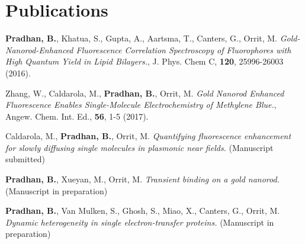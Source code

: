 \chapter*{Publications}
\label{ch:Publications}

\begin{enumerate}{%

	\item \textbf{Pradhan, B.}, Khatua, S., Gupta, A., Aartsma, T., Canters, G., Orrit, M. \textit{Gold-Nanorod-Enhanced Fluorescence Correlation Spectroscopy of Fluorophores with High Quantum Yield in Lipid Bilayers.}, J. Phys. Chem C, \textbf{120}, 25996-26003 (2016).
	
	\item Zhang, W., Caldarola, M., \textbf{Pradhan, B.}, Orrit, M. \textit{Gold Nanorod Enhanced Fluorescence Enables Single-Molecule Electrochemistry of Methylene Blue.}, Angew. Chem. Int. Ed., \textbf{56}, 1-5 (2017).

	\item Caldarola, M., \textbf{Pradhan, B.}, Orrit, M. \textit{Quantifying fluorescence enhancement for slowly diffusing single molecules in plasmonic near fields.} (Manuscript submitted)

	\item \textbf{Pradhan, B.}, Xueyan, M., Orrit, M. \textit{Transient binding on a gold nanorod.} (Manuscript in preparation)

	\item \textbf{Pradhan, B.}, Van Mulken, S., Ghosh, S., Miao, X., Canters, G., Orrit, M. \textit{Dynamic heterogeneity in single electron-transfer proteins.} (Manuscript in preparation)


}\end{enumerate}